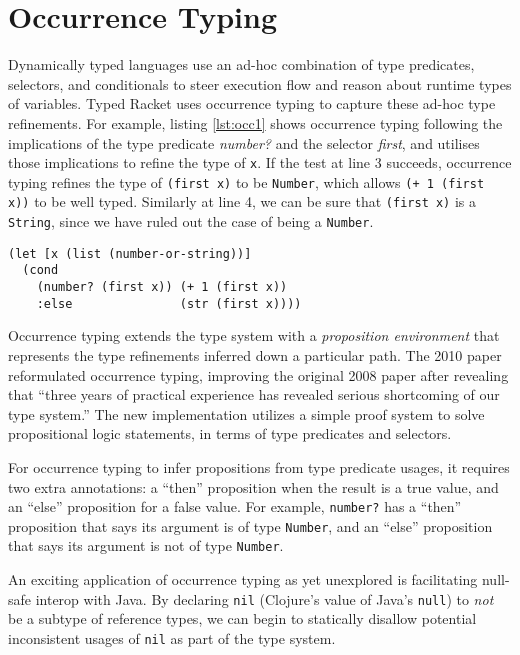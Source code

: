 \section{Occurrence Typing}
\label{sec:OccurrenceTyping}

Dynamically typed languages use an ad-hoc combination of type predicates,
selectors, and conditionals to steer execution flow and reason about runtime types of variables.
Typed Racket uses occurrence typing to capture these ad-hoc type refinements.
For example, listing \ref{lst:occ1} shows occurrence typing following the implications 
of the type predicate \emph{number?} and the selector \emph{first}, and utilises those implications to refine
the type of \lstinline|x|. If the test at line 3 succeeds, occurrence typing refines the
type of \lstinline|(first x)| to be \lstinline|Number|, which allows \lstinline|(+ 1 (first x))|
to be well typed. Similarly at line 4, we can be sure that \lstinline|(first x)| is
a \lstinline|String|, since we have ruled out the case of being a \lstinline|Number|.

\begin{lstlisting}[caption=A well typed form utilising occurrence typing with Clojure syntax, label=lst:occ1]
(let [x (list (number-or-string))]
  (cond 
    (number? (first x)) (+ 1 (first x))
    :else               (str (first x))))
\end{lstlisting}

Occurrence typing \cite{TF08}
\cite{TF10} extends the type 
system with a \emph{proposition environment} that represents 
the type refinements inferred down a particular path.
The 2010 paper \cite{TF10}
reformulated occurrence typing, improving the original 2008 paper
\cite{TF08}
after revealing that ``three years of practical experience has revealed
serious shortcoming of our type system.''\cite{TF10}
The new implementation utilizes a simple proof system to solve
propositional logic statements, in terms of type predicates and selectors.

For occurrence typing to infer propositions from type predicate usages, it requires 
two extra annotations: a ``then'' proposition
when the result is a true value, and an ``else'' proposition for a false value.
For example, \lstinline|number?| has a ``then'' proposition that says its argument
is of type \lstinline|Number|, and an ``else'' proposition that says its argument is not of type \lstinline|Number|.

An exciting application of occurrence typing as yet unexplored is facilitating null-safe interop with Java.
By declaring \lstinline|nil| (Clojure's value of Java's \lstinline|null|) to \emph{not} be a subtype of reference types,
we can begin to statically disallow potential inconsistent usages of \lstinline|nil| as part of the type system.

